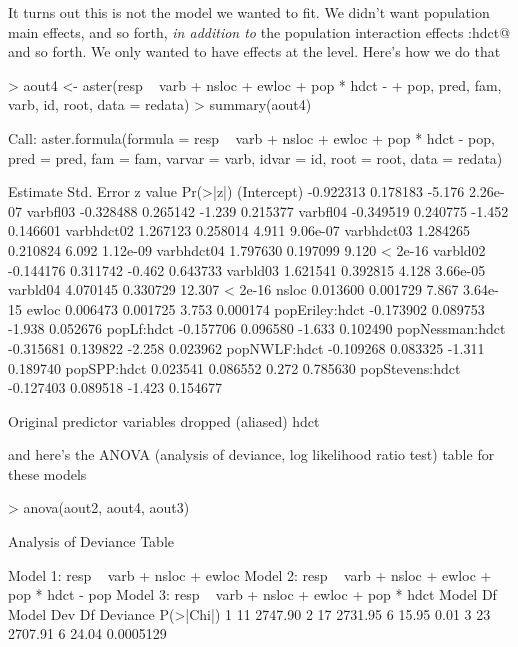 \documentclass[11pt]{article}
\begin{document}
It turns out this is not the model we wanted to fit.  We didn't want
population main effects, \verb@popEriley@ and so forth, \emph{in addition to}
the population interaction effects \verb@popEriley:hdct@ and so forth.  We
only wanted \verb@pop@ to have effects at the \verb@hdct@ level.
Here's how we do that
\begin{Schunk}
\begin{Sinput}
> aout4 <- aster(resp ~ varb + nsloc + ewloc + pop * hdct - 
+     pop, pred, fam, varb, id, root, data = redata)
> summary(aout4)
\end{Sinput}
\begin{Soutput}
Call:
aster.formula(formula = resp ~ varb + nsloc + ewloc + pop * hdct - 
    pop, pred = pred, fam = fam, varvar = varb, idvar = id, root = root, 
    data = redata)

                 Estimate Std. Error z value Pr(>|z|)
(Intercept)     -0.922313   0.178183  -5.176 2.26e-07
varbfl03        -0.328488   0.265142  -1.239 0.215377
varbfl04        -0.349519   0.240775  -1.452 0.146601
varbhdct02       1.267123   0.258014   4.911 9.06e-07
varbhdct03       1.284265   0.210824   6.092 1.12e-09
varbhdct04       1.797630   0.197099   9.120  < 2e-16
varbld02        -0.144176   0.311742  -0.462 0.643733
varbld03         1.621541   0.392815   4.128 3.66e-05
varbld04         4.070145   0.330729  12.307  < 2e-16
nsloc            0.013600   0.001729   7.867 3.64e-15
ewloc            0.006473   0.001725   3.753 0.000174
popEriley:hdct  -0.173902   0.089753  -1.938 0.052676
popLf:hdct      -0.157706   0.096580  -1.633 0.102490
popNessman:hdct -0.315681   0.139822  -2.258 0.023962
popNWLF:hdct    -0.109268   0.083325  -1.311 0.189740
popSPP:hdct      0.023541   0.086552   0.272 0.785630
popStevens:hdct -0.127403   0.089518  -1.423 0.154677

Original predictor variables dropped (aliased)
     hdct 
\end{Soutput}
\end{Schunk}
and here's the ANOVA (analysis of deviance, log likelihood ratio test)
table for these models
\begin{Schunk}
\begin{Sinput}
> anova(aout2, aout4, aout3)
\end{Sinput}
\begin{Soutput}
Analysis of Deviance Table

Model 1: resp ~ varb + nsloc + ewloc
Model 2: resp ~ varb + nsloc + ewloc + pop * hdct - pop
Model 3: resp ~ varb + nsloc + ewloc + pop * hdct
  Model Df Model Dev Df Deviance P(>|Chi|)
1       11   2747.90                      
2       17   2731.95  6    15.95      0.01
3       23   2707.91  6    24.04 0.0005129
\end{Soutput}
\end{Schunk}
\end{document}

